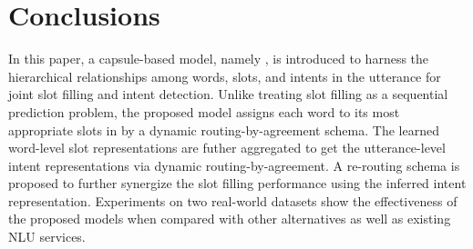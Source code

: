 \section{Conclusions}
In this paper, a capsule-based model, namely {\ModelName}, is introduced to harness the hierarchical relationships among words, slots, and intents in the utterance for joint slot filling and intent detection.
Unlike treating slot filling as a sequential prediction problem, the proposed model assigns each word to its most appropriate slots in {\SecondCapsule} by a dynamic routing-by-agreement schema. The learned word-level slot representations are futher aggregated to get the utterance-level intent representations via dynamic routing-by-agreement. A re-routing schema is proposed to further synergize the slot filling performance using the inferred intent representation.
Experiments on two real-world datasets show the effectiveness of the proposed models when compared with other alternatives as well as existing NLU services.